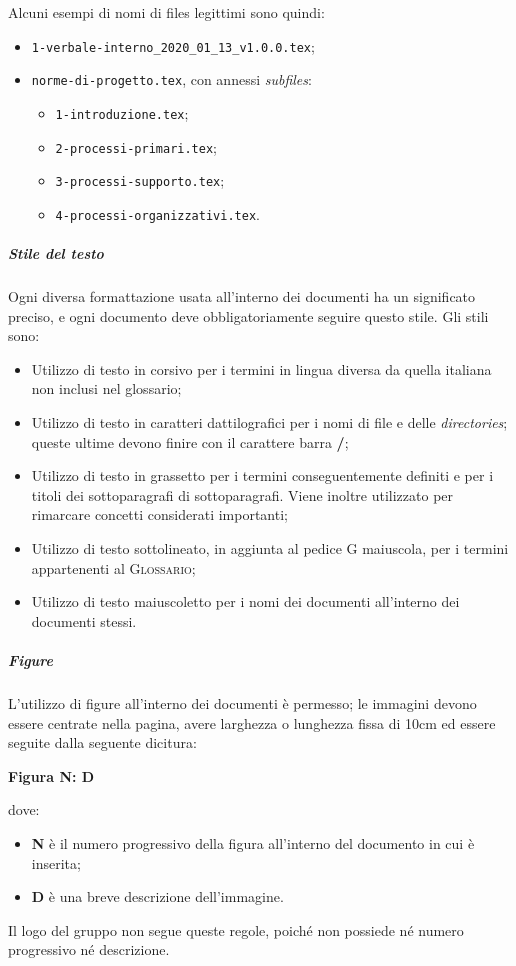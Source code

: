 \documentclass[../norme-di-progetto.tex]{subfiles}
\begin{document}
Alcuni esempi di nomi di files legittimi sono quindi:
\begin{itemize}
  \item \texttt{1-verbale-interno\_2020\_01\_13\_v1.0.0.tex};
  \item \texttt{norme-di-progetto.tex}, con annessi \textit{subfiles}:
    \begin{itemize}
      \item \texttt{1-introduzione.tex};
      \item \texttt{2-processi-primari.tex};
      \item \texttt{3-processi-supporto.tex};
      \item \texttt{4-processi-organizzativi.tex}.
    \end{itemize}
\end{itemize}

\subparagraph{Stile del testo}
Ogni diversa formattazione usata all'interno dei documenti ha un significato preciso, e ogni documento deve obbligatoriamente seguire questo stile. Gli stili sono:
\begin{itemize}
  \item Utilizzo di testo in corsivo per i termini in lingua diversa da quella italiana non inclusi nel glossario;
  \item Utilizzo di testo in caratteri dattilografici per i nomi di file e delle \textit{directories}; queste ultime devono finire con il carattere barra \textbf{/};
  \item Utilizzo di testo in grassetto per i termini conseguentemente definiti e per i titoli dei sottoparagrafi di sottoparagrafi. Viene inoltre utilizzato per rimarcare concetti considerati importanti;
  \item Utilizzo di testo sottolineato, in aggiunta al pedice G maiuscola, per i termini appartenenti al \textsc{Glossario};
  \item Utilizzo di testo maiuscoletto per i nomi dei documenti all'interno dei documenti stessi.
\end{itemize}

\subparagraph{Figure}
L'utilizzo di figure all'interno dei documenti è permesso; le immagini devono essere centrate nella pagina, avere larghezza o lunghezza fissa di 10cm ed essere seguite dalla seguente dicitura: \\ \begin{center}
  \centering
  \textbf{Figura N: D}
\end{center} dove:
\begin{itemize}
  \item \textbf{N} è il numero progressivo della figura all'interno del documento in cui è inserita;
  \item \textbf{D} è una breve descrizione dell'immagine.
\end{itemize}
Il logo del gruppo non segue queste regole, poiché non possiede né numero progressivo né descrizione.
\end{document}
